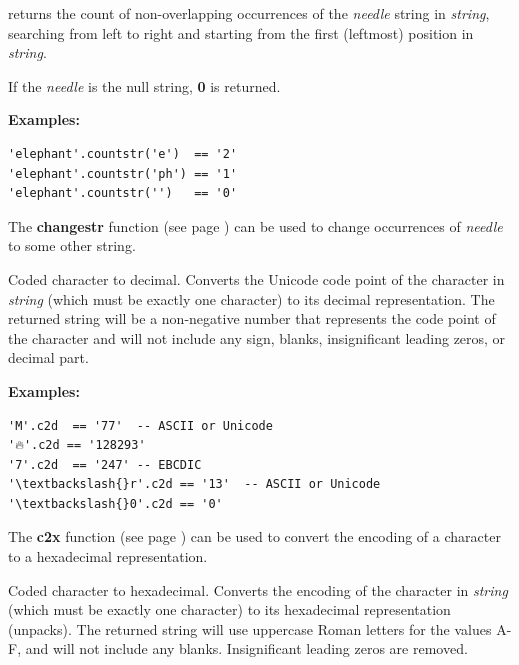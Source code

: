 \begin{description}
\item[countstr(needle)]\label{refcoustr}
returns the count of non-overlapping occurrences of the
\emph{needle} string in \emph{string}, searching from left to
right and starting from the first (leftmost) position in
\emph{string}.
 
If the \emph{needle} is the null string, \textbf{0} is returned.
 
\textbf{Examples:}
\begin{lstlisting}
'elephant'.countstr('e')  == '2'
'elephant'.countstr('ph') == '1'
'elephant'.countstr('')   == '0'
\end{lstlisting}
 The  \textbf{changestr} function (see page \pageref{refchastr})  can be used to
change occurrences of \emph{needle} to some other string.
\item[c2d()]\label{refc2d}

Coded character to decimal.
Converts the Unicode code point of the character in \emph{string} (which must
be exactly one character) to its decimal representation.
The returned string will be a non-negative number that represents
the code point of the character and will not include any sign, blanks,
insignificant leading zeros, or decimal part.
 
\textbf{Examples:}
\begin{lstlisting}
'M'.c2d  == '77'  -- ASCII or Unicode
'🔥'.c2d == '128293'
'7'.c2d  == '247' -- EBCDIC
'\textbackslash{}r'.c2d == '13'  -- ASCII or Unicode
'\textbackslash{}0'.c2d == '0'
\end{lstlisting}
 The  \textbf{c2x} function (see page \pageref{refc2x})  can be used to
convert the encoding of a character to a hexadecimal representation.
\item[c2x()]\label{refc2x}

Coded character to hexadecimal.
Converts the encoding of the character in \emph{string} (which must be
exactly one character) to its hexadecimal representation (unpacks).
The returned string will use uppercase Roman letters for the values A-F,
and will not include any blanks.
Insignificant leading zeros are removed.
 

\end{description}
